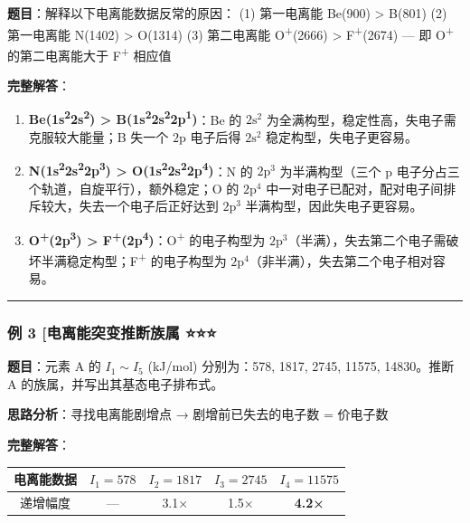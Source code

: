 \documentclass[a4paper,11pt]{ctexart}
\newcounter{none}
\begin{document}
\textbf{题目}：解释以下电离能数据反常的原因：
(1) 第一电离能 Be(900) \textgreater{} B(801)
(2) 第一电离能 N(1402) \textgreater{} O(1314)
(3) 第二电离能 O\textsuperscript{+}(2666) \textgreater{} F\textsuperscript{+}(2674) --- 即 O\textsuperscript{+} 的第二电离能大于 F\textsuperscript{+} 相应值

\textbf{完整解答}：

\begin{enumerate}
\def\labelenumi{(\arabic{enumi})}
\item
  \textbf{Be(1s\textsuperscript{2}2s\textsuperscript{2}) \textgreater{} B(1s\textsuperscript{2}2s\textsuperscript{2}2p\textsuperscript{1})}：Be 的 \(2\mathrm{s}^2\) 为全满构型，稳定性高，失电子需克服较大能量；B 失一个 \(2\mathrm{p}\) 电子后得 \(2\mathrm{s}^2\) 稳定构型，失电子更容易。
\item
  \textbf{N(1s\textsuperscript{2}2s\textsuperscript{2}2p\textsuperscript{3}) \textgreater{} O(1s\textsuperscript{2}2s\textsuperscript{2}2p\textsuperscript{4})}：N 的 \(2\mathrm{p}^3\) 为半满构型（三个 p 电子分占三个轨道，自旋平行），额外稳定；O 的 \(2\mathrm{p}^4\) 中一对电子已配对，配对电子间排斥较大，失去一个电子后正好达到 \(2\mathrm{p}^3\) 半满构型，因此失电子更容易。
\item
  \textbf{O\textsuperscript{+}(2p\textsuperscript{3}) \textgreater{} F\textsuperscript{+}(2p\textsuperscript{4})}：O\textsuperscript{+} 的电子构型为 \(2\mathrm{p}^3\)（半满），失去第二个电子需破坏半满稳定构型；F\textsuperscript{+} 的电子构型为 \(2\mathrm{p}^4\)（非半满），失去第二个电子相对容易。
\end{enumerate}

\begin{center}\rule{0.5\linewidth}{0.5pt}\end{center}

\subsubsection{例 3 {[}电离能突变推断族属 ⭐⭐⭐}\label{ux4f8b-3-ux7535ux79bbux80fdux7a81ux53d8ux63a8ux65adux65cfux5c5e}

\textbf{题目}：元素 A 的 \(I_1\sim I_5\) (kJ/mol) 分别为：578, 1817, 2745, 11575, 14830。推断 A 的族属，并写出其基态电子排布式。

\textbf{思路分析}：寻找电离能剧增点 → 剧增前已失去的电子数 = 价电子数

\textbf{完整解答}：

{\def\LTcaptype{none} %
\begin{longtable}[]{@{}ccccc@{}}
\toprule\noalign{}
电离能数据 & \(I_1=578\) & \(I_2=1817\) & \(I_3=2745\) & \(I_4=11575\) \\
\midrule\noalign{}
\endhead
\bottomrule\noalign{}
\endlastfoot
递增幅度 & --- & 3.1× & 1.5× & \textbf{4.2×} \\
\end{longtable}
}
\end{document}
